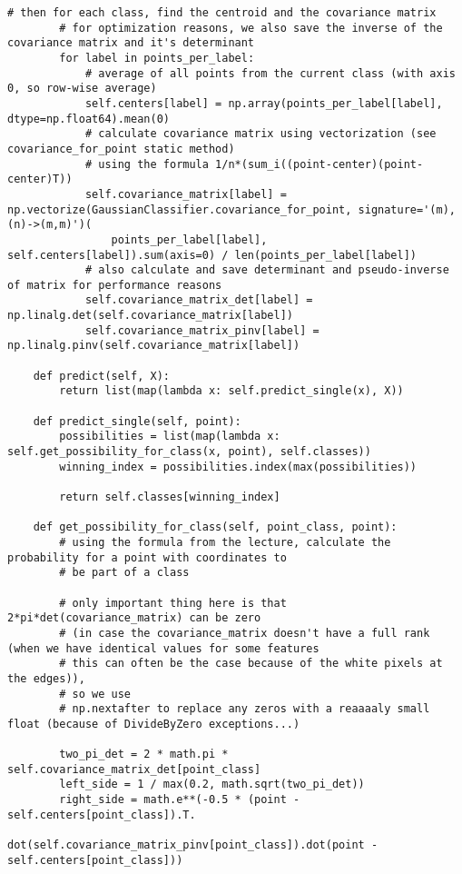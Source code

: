 \begin{lstlisting}[style]
        # then for each class, find the centroid and the covariance matrix
        # for optimization reasons, we also save the inverse of the covariance matrix and it's determinant
        for label in points_per_label:
            # average of all points from the current class (with axis 0, so row-wise average)
            self.centers[label] = np.array(points_per_label[label], dtype=np.float64).mean(0)
            # calculate covariance matrix using vectorization (see covariance_for_point static method)
            # using the formula 1/n*(sum_i((point-center)(point-center)T))
            self.covariance_matrix[label] = np.vectorize(GaussianClassifier.covariance_for_point, signature='(m),(n)->(m,m)')(
                points_per_label[label], self.centers[label]).sum(axis=0) / len(points_per_label[label])
            # also calculate and save determinant and pseudo-inverse of matrix for performance reasons
            self.covariance_matrix_det[label] = np.linalg.det(self.covariance_matrix[label])
            self.covariance_matrix_pinv[label] = np.linalg.pinv(self.covariance_matrix[label])

    def predict(self, X):
        return list(map(lambda x: self.predict_single(x), X))

    def predict_single(self, point):
        possibilities = list(map(lambda x: self.get_possibility_for_class(x, point), self.classes))
        winning_index = possibilities.index(max(possibilities))

        return self.classes[winning_index]

    def get_possibility_for_class(self, point_class, point):
        # using the formula from the lecture, calculate the probability for a point with coordinates to
        # be part of a class

        # only important thing here is that 2*pi*det(covariance_matrix) can be zero
        # (in case the covariance_matrix doesn't have a full rank (when we have identical values for some features
        # this can often be the case because of the white pixels at the edges)),
        # so we use
        # np.nextafter to replace any zeros with a reaaaaly small float (because of DivideByZero exceptions...)

        two_pi_det = 2 * math.pi * self.covariance_matrix_det[point_class]
        left_side = 1 / max(0.2, math.sqrt(two_pi_det))
        right_side = math.e**(-0.5 * (point - self.centers[point_class]).T.
                              dot(self.covariance_matrix_pinv[point_class]).dot(point - self.centers[point_class]))


\end{lstlisting}
